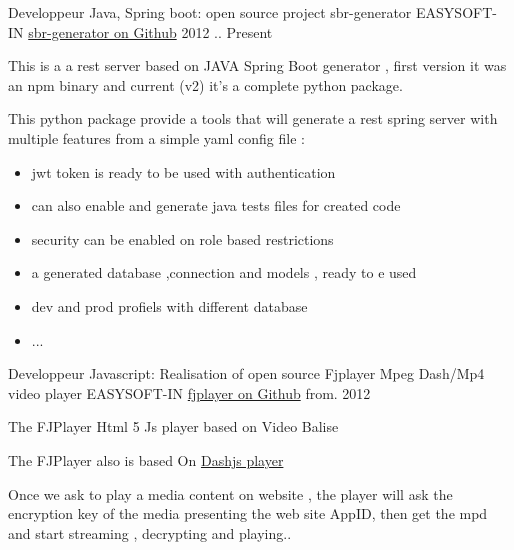 \documentclass[11pt, a4paper]{awesome-cv} %
\begin{document}
\begin{cventries}


    \cventry
    {Developpeur Java, Spring boot: open source project sbr-generator} %
    {EASYSOFT-IN} %
    { \href{https://github.com/medazzo/sbr-generator}{sbr-generator on Github} }%
    {2012 .. Present} %
    { %
        \begin{cvitems}
            \item {This is a a rest server based on JAVA Spring Boot generator , first version it was an npm binary and current (v2) it's a complete python package.}
            \item {This python package provide a tools that will generate a rest spring server with multiple features from a simple yaml config file :}
            \begin{itemize}
                \item {jwt token is ready to be used with authentication}
                \item {can also enable and generate java tests files for created code }
                \item {security can be enabled on role based restrictions}
                \item {a generated database ,connection and models , ready to e used}
                \item {dev and prod profiels with different database}
                \item {...}
            \end{itemize}
        \end{cvitems}
    }

    \cventry
    {Developpeur Javascript: Realisation of open source Fjplayer Mpeg Dash/Mp4 video player} %
    {EASYSOFT-IN} %
    { \href{hhttps://github.com/medazzo/fjplayer}{fjplayer on Github} } %
    {from. 2012} %
    { %
        \begin{cvitems}
            \item {The FJPlayer Html 5 Js player based on Video Balise }
            \item {The FJPlayer also is based On \href{http://dashif.org/reference/players/javascript/1.4.0/samples/dash-if-reference-player/}{Dashjs player} }
            \item {Once we ask to play a media content on website , the player will ask the encryption key of the media presenting the web site AppID, then get the mpd and start streaming , decrypting  and playing..}
        \end{cvitems}
    }


\end{cventries}
\end{document}
